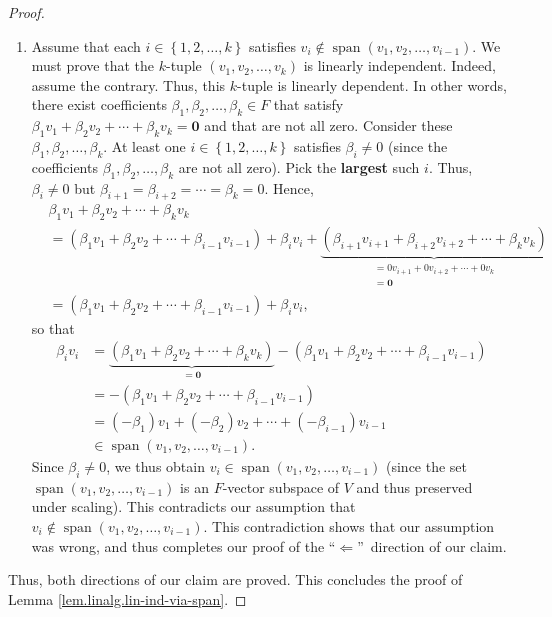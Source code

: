 \begin{proof}
\begin{enumerate}
\item[$\Longleftarrow:$] Assume that each $i\in\left\{  1,2,\ldots,k\right\}
$ satisfies $v_{i}\notin\operatorname*{span}\left(  v_{1},v_{2},\ldots
,v_{i-1}\right)  $. We must prove that the $k$-tuple $\left(  v_{1}%
,v_{2},\ldots,v_{k}\right)  $ is linearly independent. Indeed, assume the
contrary. Thus, this $k$-tuple is linearly dependent. In other words, there
exist coefficients $\beta_{1},\beta_{2},\ldots,\beta_{k}\in F$ that satisfy
$\beta_{1}v_{1}+\beta_{2}v_{2}+\cdots+\beta_{k}v_{k}=\mathbf{0}$ and that are
not all zero. Consider these $\beta_{1},\beta_{2},\ldots,\beta_{k}$. At least
one $i\in\left\{  1,2,\ldots,k\right\}  $ satisfies $\beta_{i}\neq0$ (since
the coefficients $\beta_{1},\beta_{2},\ldots,\beta_{k}$ are not all zero).
Pick the \textbf{largest} such $i$. Thus, $\beta_{i}\neq0$ but $\beta
_{i+1}=\beta_{i+2}=\cdots=\beta_{k}=0$. Hence,
\begin{align*}
&  \beta_{1}v_{1}+\beta_{2}v_{2}+\cdots+\beta_{k}v_{k}\\
&  =\left(  \beta_{1}v_{1}+\beta_{2}v_{2}+\cdots+\beta_{i-1}v_{i-1}\right)
+\beta_{i}v_{i}+\underbrace{\left(  \beta_{i+1}v_{i+1}+\beta_{i+2}%
v_{i+2}+\cdots+\beta_{k}v_{k}\right)  }_{\substack{=0v_{i+1}+0v_{i+2}%
+\cdots+0v_{k}\\=\mathbf{0}}}\\
&  =\left(  \beta_{1}v_{1}+\beta_{2}v_{2}+\cdots+\beta_{i-1}v_{i-1}\right)
+\beta_{i}v_{i},
\end{align*}
so that%
\begin{align*}
\beta_{i}v_{i}  &  =\underbrace{\left(  \beta_{1}v_{1}+\beta_{2}v_{2}%
+\cdots+\beta_{k}v_{k}\right)  }_{=\mathbf{0}}-\left(  \beta_{1}v_{1}%
+\beta_{2}v_{2}+\cdots+\beta_{i-1}v_{i-1}\right) \\
&  =-\left(  \beta_{1}v_{1}+\beta_{2}v_{2}+\cdots+\beta_{i-1}v_{i-1}\right) \\
&  =\left(  -\beta_{1}\right)  v_{1}+\left(  -\beta_{2}\right)  v_{2}%
+\cdots+\left(  -\beta_{i-1}\right)  v_{i-1}\\
&  \in\operatorname*{span}\left(  v_{1},v_{2},\ldots,v_{i-1}\right)  .
\end{align*}
Since $\beta_{i}\neq0$, we thus obtain $v_{i}\in\operatorname*{span}\left(
v_{1},v_{2},\ldots,v_{i-1}\right)  $ (since the set $\operatorname*{span}%
\left(  v_{1},v_{2},\ldots,v_{i-1}\right)  $ is an $F$-vector subspace of $V$
and thus preserved under scaling). This contradicts our assumption that
$v_{i}\notin\operatorname*{span}\left(  v_{1},v_{2},\ldots,v_{i-1}\right)  $.
This contradiction shows that our assumption was wrong, and thus completes our
proof of the \textquotedblleft$\Longleftarrow$\textquotedblright\ direction of
our claim.
\end{enumerate}

Thus, both directions of our claim are proved. This concludes the proof of
Lemma \ref{lem.linalg.lin-ind-via-span}.
\end{proof}

